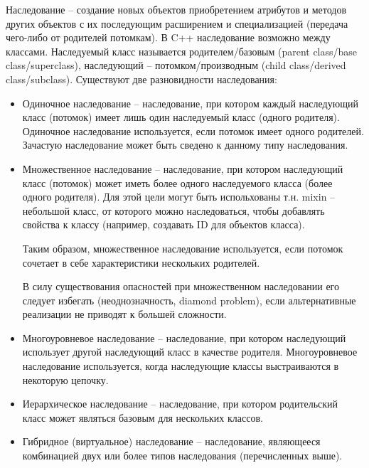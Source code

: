 \documentclass[a4paper,12pt]{article}	%
\begin{document}
	Наследование -- создание новых объектов приобретением атрибутов и методов других объектов с их последующим расширением и специализацией (передача чего-либо от родителей потомкам). В C++ наследование возможно между классами. Наследуемый класс называется родителем/базовым (parent class/base class/superclass), наследующий -- потомком/производным (child class/derived class/subclass).
	Существуют две разновидности наследования:
	
	\begin{itemize}
	
		\item Одиночное наследование -- наследование, при котором каждый наследующий класс (потомок) имеет лишь один наследуемый класс (одного родителя). Одиночное наследование используется, если потомок имеет одного родителей. Зачастую наследование может быть сведено к данному типу наследования.
		
		\item Множественное наследование -- наследование, при котором наследующий класс (потомок) может иметь более одного наследуемого класса (более одного родителя). Для этой цели могут быть испольхованы т.н.  mixin -- небольшой класс, от которого можно наследоваться, чтобы добавлять свойства к классу (например, создавать ID для объектов класса).
		
		Таким образом, множественное наследование используется, если потомок сочетает в себе характеристики нескольких родителей.
		
		В силу существования опасностей при множественном наследовании его следует избегать (неоднозначность, diamond problem), если альтернативные реализации не приводят к большей сложности.
		
		\item Многоуровневое наследование -- наследование, при котором наследующий использует другой наследующий класс в качестве родителя. Многоуровневое наследование используется, когда наследующие классы выстраиваются в некоторую цепочку.
		
		\item Иерархическое наследование -- наследование, при котором родительский класс может являться базовым для нескольких классов.
		
		\item Гибридное (виртуальное) наследование -- наследование, являющееся комбинацией двух или более типов наследования (перечисленных выше).	
	
	\end{itemize}
	
\end{document}
